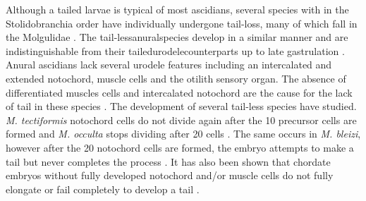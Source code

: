 Although a tailed larvae is typical of most ascidians, several species with in the Stolidobranchia order have individually undergone tail-loss, many of which fall in the Molgulidae \cite{berrill_studies_1931, jeffery_evolution_1999, huber_evolution_2000, maliska_molgula_2010}. The tail-less\textemdash anural\textemdash species develop in a similar manner and are indistinguishable from their tailed\textemdash urodele\textemdash counterparts up to late gastrulation \cite{berrill_studies_1931, swalla_interspecific_1990, jeffery_factors_1992}. Anural ascidians lack several urodele features including an intercalated and extended notochord, muscle cells and the otilith sensory organ. The absence of differentiated muscles cells and intercalated notochord are the cause for the lack of tail in these species \cite{miyamoto_formation_1985, swalla_interspecific_1990}. 
The development of several tail-less species have studied. \textit{M. tectiformis} notochord cells do not divide again after the 10 precursor cells are formed and \textit{M. occulta} stops dividing after 20 cells \cite{jeffery_evolution_1999}. The same occurs in \textit{M. bleizi}, however after the 20 notochord cells are formed, the embryo attempts to make a tail but never completes the process \cite{swalla_novel_1993}. It has also been shown that chordate embryos without fully developed notochord and/or muscle cells do not fully elongate or fail completely to develop a tail \cite{jeffery_evolution_1999,takada_brachyury_2002,stemple_structure_2005}. 
